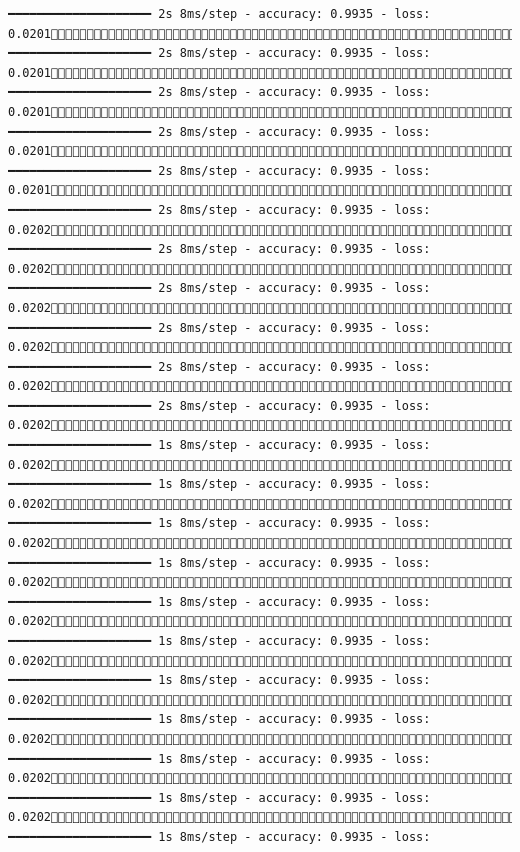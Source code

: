 \documentclass[
  letterpaper,
  DIV=11,
  numbers=noendperiod]{scrreprt}
\begin{document}
\begin{verbatim}
━━━━━━━━━━━━━━━━━━━━ 2s 8ms/step - accuracy: 0.9935 - loss: 0.02011541/1875 ━━━━━━━━━━━━━━━━━━━━ 2s 8ms/step - accuracy: 0.9935 - loss: 0.02011549/1875 ━━━━━━━━━━━━━━━━━━━━ 2s 8ms/step - accuracy: 0.9935 - loss: 0.02011556/1875 ━━━━━━━━━━━━━━━━━━━━ 2s 8ms/step - accuracy: 0.9935 - loss: 0.02011563/1875 ━━━━━━━━━━━━━━━━━━━━ 2s 8ms/step - accuracy: 0.9935 - loss: 0.02011571/1875 ━━━━━━━━━━━━━━━━━━━━ 2s 8ms/step - accuracy: 0.9935 - loss: 0.02021578/1875 ━━━━━━━━━━━━━━━━━━━━ 2s 8ms/step - accuracy: 0.9935 - loss: 0.02021585/1875 ━━━━━━━━━━━━━━━━━━━━ 2s 8ms/step - accuracy: 0.9935 - loss: 0.02021592/1875 ━━━━━━━━━━━━━━━━━━━━ 2s 8ms/step - accuracy: 0.9935 - loss: 0.02021599/1875 ━━━━━━━━━━━━━━━━━━━━ 2s 8ms/step - accuracy: 0.9935 - loss: 0.02021606/1875 ━━━━━━━━━━━━━━━━━━━━ 2s 8ms/step - accuracy: 0.9935 - loss: 0.02021614/1875 ━━━━━━━━━━━━━━━━━━━━ 1s 8ms/step - accuracy: 0.9935 - loss: 0.02021621/1875 ━━━━━━━━━━━━━━━━━━━━ 1s 8ms/step - accuracy: 0.9935 - loss: 0.02021627/1875 ━━━━━━━━━━━━━━━━━━━━ 1s 8ms/step - accuracy: 0.9935 - loss: 0.02021633/1875 ━━━━━━━━━━━━━━━━━━━━ 1s 8ms/step - accuracy: 0.9935 - loss: 0.02021639/1875 ━━━━━━━━━━━━━━━━━━━━ 1s 8ms/step - accuracy: 0.9935 - loss: 0.02021645/1875 ━━━━━━━━━━━━━━━━━━━━ 1s 8ms/step - accuracy: 0.9935 - loss: 0.02021652/1875 ━━━━━━━━━━━━━━━━━━━━ 1s 8ms/step - accuracy: 0.9935 - loss: 0.02021659/1875 ━━━━━━━━━━━━━━━━━━━━ 1s 8ms/step - accuracy: 0.9935 - loss: 0.02021667/1875 ━━━━━━━━━━━━━━━━━━━━ 1s 8ms/step - accuracy: 0.9935 - loss: 0.02021675/1875 ━━━━━━━━━━━━━━━━━━━━ 1s 8ms/step - accuracy: 0.9935 - loss: 0.02021682/1875 ━━━━━━━━━━━━━━━━━━━━ 1s 8ms/step - accuracy: 0.9935 - loss: 
\end{verbatim}
\end{document}
